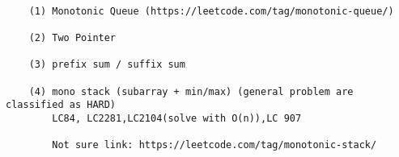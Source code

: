 
\begin{verbatim}

    (1) Monotonic Queue (https://leetcode.com/tag/monotonic-queue/)

    (2) Two Pointer

    (3) prefix sum / suffix sum

    (4) mono stack (subarray + min/max) (general problem are classified as HARD)
        LC84, LC2281,LC2104(solve with O(n)),LC 907

        Not sure link: https://leetcode.com/tag/monotonic-stack/

    
\end{verbatim}